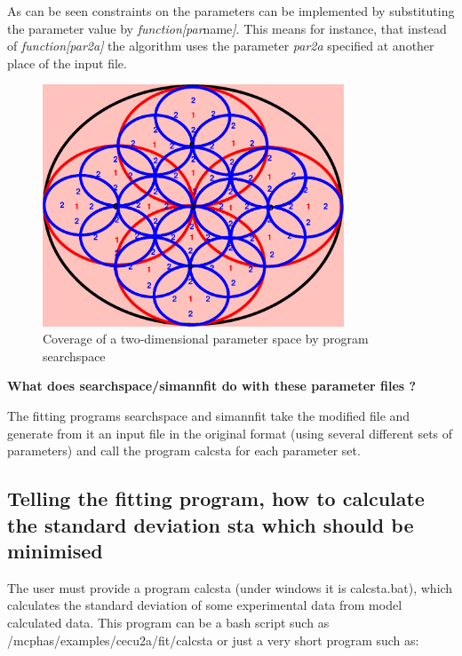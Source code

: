 As can be seen constraints on the parameters can be implemented by
substituting the parameter value by {\em function[par}name{\em ]}.
This means for instance, that instead of {\em function[par2a]} the algorithm
uses the parameter {\em par2a} specified at another place of the input file.

\begin{figure}[hb]%
\begin{center}\leavevmode
\includegraphics[angle=0, width=0.8\textwidth]{./figsrc/searchspace.eps}
\end{center}\label{searchspace}
\caption{Coverage of a two-dimensional parameter space by program {\prg searchspace}}
\end{figure}

{\bf What does searchspace/simannfit do with these parameter files ?}

The fitting programs {\prg searchspace} and 
{\prg simannfit} take the modified file and generate from it an
input file in the original format (using several different
sets of parameters) and call the program
{\prg calcsta} for each parameter set.

\subsection{Telling the fitting program, how to calculate the standard deviation {\prg sta} which should be minimised}


The user must provide a program {\prg calcsta}  (under windows 
it is {\prg calcsta.bat}), which calculates the standard deviation
of some experimental data from model calculated data. This program can
be a bash script such as {\prg /mcphas/examples/cecu2a/fit/calcsta} or just a
very short program such as:


